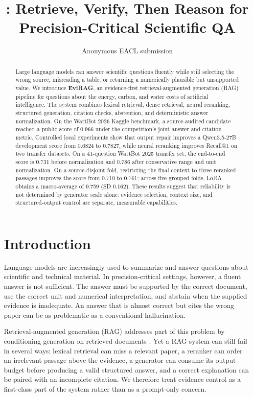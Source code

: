 \documentclass[11pt]{article}
\title{\method: Retrieve, Verify, Then Reason for Precision-Critical Scientific QA}
\author{Anonymous EACL submission}
\newcommand{\method}{\textbf{EviRAG}}
\begin{document}
\maketitle

\begin{abstract}
Large language models can answer scientific questions fluently while still selecting the wrong source, misreading a table, or returning a numerically plausible but unsupported value. We introduce \method, an evidence-first retrieval-augmented generation (RAG) pipeline for questions about the energy, carbon, and water costs of artificial intelligence. The system combines lexical retrieval, dense retrieval, neural reranking, structured generation, citation checks, abstention, and deterministic answer normalization. On the WattBot 2026 Kaggle benchmark, a source-audited candidate reached a public score of 0.966 under the competition's joint answer-and-citation metric. Controlled local experiments show that output repair improves a Qwen3.5-27B development score from 0.6824 to 0.7827, while neural reranking improves Recall@1 on two transfer datasets. On a 41-question WattBot 2025 transfer set, the end-to-end score is 0.731 before normalization and 0.786 after conservative range and unit normalization. On a source-disjoint fold, restricting the final context to three reranked passages improves the score from 0.710 to 0.761; across five grouped folds, LoRA obtains a macro-average of 0.759 (SD 0.162). These results suggest that reliability is not determined by generator scale alone: evidence selection, context size, and structured-output control are separate, measurable capabilities.
\end{abstract}

\section{Introduction}
\label{sec:intro}
Language models are increasingly used to summarize and answer questions about scientific and technical material. In precision-critical settings, however, a fluent answer is not sufficient. The answer must be supported by the correct document, use the correct unit and numerical interpretation, and abstain when the supplied evidence is inadequate. An answer that is almost correct but cites the wrong paper can be as problematic as a conventional hallucination.

Retrieval-augmented generation (RAG) addresses part of this problem by conditioning generation on retrieved documents \citep{lewis2020rag}. Yet a RAG system can still fail in several ways: lexical retrieval can miss a relevant paper, a reranker can order an irrelevant passage above the evidence, a generator can consume its output budget before producing a valid structured answer, and a correct explanation can be paired with an incomplete citation. We therefore treat evidence control as a first-class part of the system rather than as a prompt-only concern.
\end{document}
